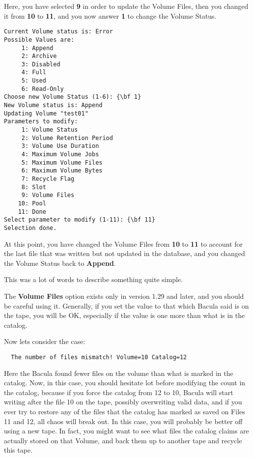Here, you have selected {\bf 9} in order to update the Volume Files, then you
changed it from {\bf 10} to {\bf 11}, and you now answer {\bf 1} to change the
Volume Status. 

\footnotesize
\begin{verbatim}
Current Volume status is: Error
Possible Values are:
     1: Append
     2: Archive
     3: Disabled
     4: Full
     5: Used
     6: Read-Only
Choose new Volume Status (1-6): {\bf 1}
New Volume status is: Append
Updating Volume "test01"
Parameters to modify:
     1: Volume Status
     2: Volume Retention Period
     3: Volume Use Duration
     4: Maximum Volume Jobs
     5: Maximum Volume Files
     6: Maximum Volume Bytes
     7: Recycle Flag
     8: Slot
     9: Volume Files
    10: Pool
    11: Done
Select parameter to modify (1-11): {\bf 11}
Selection done.
\end{verbatim}
\normalsize

At this point, you have changed the Volume Files from {\bf 10} to {\bf 11} to
account for the last file that was written but not updated in the database,
and you changed the Volume Status back to {\bf Append}. 

This was a lot of words to describe something quite simple. 

The {\bf Volume Files} option exists only in version 1.29 and later, and you
should be careful using it. Generally, if you set the value to that which
Bacula said is on the tape, you will be OK, especially if the value is one
more than what is in the catalog. 

Now lets consider the case: 

\footnotesize
\begin{verbatim}
  The number of files mismatch! Volume=10 Catalog=12
\end{verbatim}
\normalsize

Here the Bacula found fewer files on the volume than what is marked in the
catalog. Now, in this case, you should hesitate lot before modifying the count
in the catalog, because if you force the catalog from 12 to 10, Bacula will
start writing after the file 10 on the tape, possibly overwriting valid data,
and if you ever try to restore any of the files that the catalog has marked as
saved on Files 11 and 12, all chaos will break out. In this case, you will
probably be better off using a new tape. In fact, you might want to see what
files the catalog claims are actually stored on that Volume, and back them up
to another tape and recycle this tape. 

